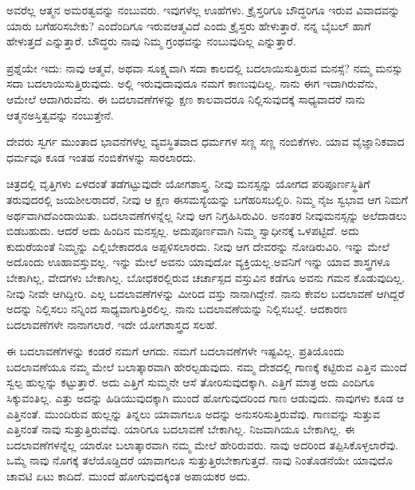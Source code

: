 ಅವರೆಲ್ಲ ಆತ್ಮನ ಅಮರತ್ವವನ್ನು ನಂಬುವರು. ಇವುಗಳೆಲ್ಲ ಊಹೆಗಳು. ಕ್ರೈಸ್ತರಿಗೂ ಬೌದ್ಧರಿಗೂ ಇರುವ ವಿವಾದವನ್ನು ಯಾರು ಬಗೆಹರಿಸಬೇಕು? ಎಂದೆಂದಿಗೂ ಇರುವ\break ಆತ್ಮವಿದೆ ಎಂದು ಕ್ರೈಸ್ತರು ಹೇಳುತ್ತಾರೆ. ನನ್ನ ಬೈಬಲ್​ ಹಾಗೆ ಹೇಳುತ್ತದೆ ಎನ್ನುತ್ತಾರೆ. ಬೌದ್ಧರು ನಾವು ನಿಮ್ಮ ಗ್ರಂಥವನ್ನು ನಂಬುವುದಿಲ್ಲ ಎನ್ನುತ್ತಾರೆ.

\vskip 5pt

ಪ್ರಶ್ನೆಯೇ ಇದು: ನಾವು ಆತ್ಮವೆ, ಅಥವಾ ಸೂಕ್ಷ್ಮವಾಗಿ ಸದಾ ಕಾಲದಲ್ಲಿ ಬದಲಾಯಿಸು\-ತ್ತಿರುವ ಮನಸ್ಸೆ? ನಮ್ಮ ಮನಸ್ಸು ಸದಾ ಬದಲಾಯಿಸುತ್ತಿರುವುದು. ಅಲ್ಲಿ ಇರುವುದಾವುದೂ ನಮಗೆ ಕಾಣುವುದಿಲ್ಲ. ನಾನು ಈಗ ಇದಾಗಿರುವೆನು, ಆಮೇಲೆ ಆದಾಗಿರುವೆನು. ಈ ಬದಲಾವಣೆಗಳನ್ನು ಕ್ಷಣ ಕಾಲವಾದರೂ ನಿಲ್ಲಿಸುವುದಕ್ಕೆ ಸಾಧ್ಯವಾದರೆ ನಾನು ಆತ್ಮನ\break ಅಸ್ತಿತ್ವವನ್ನು ನಂಬುತ್ತೇನೆ.

\vskip 5pt

ದೇವರು ಸ್ವರ್ಗ ಮುಂತಾದ ಭಾವನೆಗಳೆಲ್ಲ ವ್ಯವಸ್ಥಿತವಾದ ಧರ್ಮಗಳ ಸಣ್ಣ ಸಣ್ಣ ನಂಬಿಕೆಗಳು. ಯಾವ ವೈಜ್ಞಾನಿಕವಾದ ಧರ್ಮವೂ ಕೂಡ ಇಂತಹ ನಂಬಿಕೆಗಳನ್ನು ಸಾರಲಾರದು.

\vskip 5pt

ಚಿತ್ರದಲ್ಲಿ ವೃತ್ತಿಗಳು ಏಳದಂತೆ ತಡೆಗಟ್ಟುವುದೇ ಯೋಗಶಾಸ್ತ್ರ. ನೀವು ಮನಸ್ಸನ್ನು ಯೋಗದ ಪರಿಪೂರ್ಣಸ್ಥಿತಿಗೆ ತರುವುದರಲ್ಲಿ ಜಯಶೀಲರಾದರೆ, ನೀವು ಆ ಕ್ಷಣ ಈ\break ಸಮಸ್ಯೆಯನ್ನು ಬಗೆಹರಿಸಬಲ್ಲಿರಿ. ನಿಮ್ಮ ನೈಜ ಸ್ವಭಾವ ಆಗ ನಿಮಗೆ ಅರ್ಥವಾಗಿದೆ\break ಎಂದಾಯಿತು. ಬದಲಾವಣೆಗಳನ್ನೆಲ್ಲ ನೀವು ಆಗ ನಿಗ್ರಹಿಸಿರುವಿರಿ. ಅನಂತರ ನೀವು\break ಮನಸ್ಸನ್ನು ಅಲೆದಾಡಲು ಬಿಡಬಹುದು. ಆದರೆ ಅದು ಹಿಂದಿನ ಮನಸ್ಸಲ್ಲ. ಅದು\break ಪೂರ್ಣವಾಗಿ ನಿಮ್ಮ ಸ್ವಾಧೀನಕ್ಕೆ ಒಳಪಟ್ಟಿದೆ. ಅದು ಕುದುರೆಯಂತೆ ನಿಮ್ಮನ್ನು ಎಲ್ಲಿ\break ಬೇಕಾದರೂ ಅಪ್ಪಳಿಸಲಾರದು. ನೀವು ಆಗ ದೇವರನ್ನು ನೋಡಿರುವಿರಿ. ಇನ್ನು ಮೇಲೆ ಅದೊಂದು ಊಹಾವಸ್ತುವಲ್ಲ. ಇನ್ನು ಮೇಲೆ ಅವನು ಯಾವುದೋ ವ್ಯಕ್ತಿಯಲ್ಲ.\break ಅವನಿಗೆ ಇನ್ನು ಯಾವ ಶಾಸ್ತ್ರಗಳೂ ಬೇಕಾಗಿಲ್ಲ, ವೇದಗಳು ಬೇಕಾಗಿಲ್ಲ. ಬೋಧಕರಲ್ಲಿರುವ ಚರ್ಚಾಸ್ಪದ ವಸ್ತುವಿನ ಕಡೆಗೂ ಅವನು ಗಮನ ಕೊಡುವುದಿಲ್ಲ. ನೀವು ನೀವೇ ಆಗಿದ್ದೀರಿ. ಎಲ್ಲ ಬದಲಾವಣೆಗಳನ್ನು ಮೀರಿದ ವಸ್ತು ನಾನಾಗಿದ್ದೇನೆ. ನಾನು ಕೇವಲ ಬದಲಾವಣೆ ಆಗಿದ್ದರೆ ಅದನ್ನು ನಿಲ್ಲಿಸಲು ನನ್ನಿಂದ ಸಾಧ್ಯವಾಗುತ್ತಿರಲಿಲ್ಲ. ನಾನು ಬದಲಾವಣೆಯನ್ನು ನಿಲ್ಲಿಸಬಲ್ಲೆ. ಆದಕಾರಣ ಬದಲಾವಣೆಗಳೇ ನಾನಾಗಲಾರೆ. ಇದೇ ಯೋಗಶಾಸ್ತ್ರದ ಸಲಹೆ.

\vskip 5pt

ಈ ಬದಲಾವಣೆಗಳನ್ನು ಕಂಡರೆ ನಮಗೆ ಆಗದು. ನಮಗೆ ಬದಲಾವಣೆಗಳೇ ಇಷ್ಟವಿಲ್ಲ. ಪ್ರತಿಯೊಂದು ಬದಲಾವಣೆಯೂ ನಮ್ಮ ಮೇಲೆ ಬಲಾತ್ಕಾರವಾಗಿ ಹೇರಲ್ಪಡುವುದು. ನಮ್ಮ ದೇಶದಲ್ಲಿ ಗಾಣಕ್ಕೆ ಕಟ್ಟಿರುವ ಎತ್ತಿನ ಮುಂದೆ ಸ್ವಲ್ಪ ಹುಲ್ಲನ್ನು ಕಟ್ಟುತ್ತಾರೆ. ಅದು ಎತ್ತಿಗೆ ಸುಮ್ಮನೇ ಆಸೆ ತೋರಿಸುವುದಕ್ಕಾಗಿ. ಎತ್ತಿಗೆ ಮಾತ್ರ ಅದು ಎಂದಿಗೂ ಸಿಕ್ಕುವಂತಿಲ್ಲ. ಎತ್ತು ಅದನ್ನು ಹಿಡಿಯುವುದಕ್ಕಾಗಿ ಮುಂದೆ ಹೋಗುವುದರಿಂದ ಗಾಣ ಆಡುವುದು. ನಾವುಗಳು ಕೂಡ ಆ ಎತ್ತಿನಂತೆ. ಮುಂದಿರುವ ಹುಲ್ಲನ್ನು ತಿನ್ನಲು ಯಾವಾಗಲೂ ಅದನ್ನು ಅನುಸರಿಸುತ್ತಿರುವೆವು. ಗಾಣವನ್ನು ಸುತ್ತುವ ಎತ್ತಿನಂತೆ ನಾವು ಸುತ್ತುತ್ತಿರುವೆವು. ಯಾರಿಗೂ ಬದಲಾವಣೆ ಬೇಕಾಗಿಲ್ಲ. ನಿಜವಾಗಿಯೂ ಬೇಕಾಗಿಲ್ಲ. ಈ ಬದಲಾವಣೆಗಳನ್ನೆಲ್ಲ ಯಾರೋ ಬಲಾತ್ಕಾರವಾಗಿ ನಮ್ಮ ಮೇಲೆ ಹೇರಿರುವರು. ನಾವು ಅದರಿಂದ ತಪ್ಪಿಸಿಕೊಳ್ಳಲಾರೆವು. ಒಮ್ಮೆ ನಾವು ನೊಗಕ್ಕೆ ತಲೆಯೊಡ್ಡಿದರೆ ಯಾವಾಗಲೂ ಸುತ್ತುತ್ತಿರಬೇಕಾಗುತ್ತದೆ. ನಾವು ನಿಂತೊಡನೆಯೇ ಯಾವುದೊ ಚಾವಟಿ ಏಟು ಕಾದಿದೆ. ಮುಂದೆ ಹೋಗುವುದಕ್ಕಿಂತ ಅಪಾಯಕರ ಅದು.

